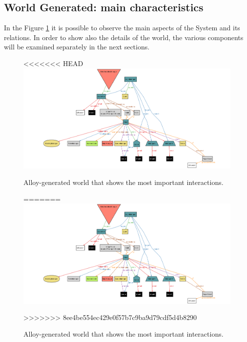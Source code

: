 \documentclass[a4paper, 12pt, oneside]{article}
\begin{document}
\begin{enumerate}[labelindent=20pt, label={UC.\arabic*}, itemindent=1em,leftmargin=!]
\subsection{World Generated: main characteristics}
In the Figure \ref{alloy_world} it is possible to observe the main aspects of the System and its relations. In order to show also the details of the world, the various components will be examined separately in the next sections.
\begin{figure}[h!]
\centering
<<<<<<< HEAD
    \centering
    \includegraphics[height=0.32\textheight, scale=0.3, keepaspectratio]{img/alloy/alloy_world.png}
    \caption{Alloy-generated world that shows the most important interactions.}
    \label{alloy_world}
=======
	\centering
  	\includegraphics[height=0.32\textheight, scale=0.3, keepaspectratio]{img/alloy/alloy_world.png}
	\caption{Alloy-generated world that shows the most important interactions.}
 	\label{alloy_world}
>>>>>>> 8ee4be554ec429e0f57b7c9ba9d79cdf5d4b8290
\end{figure}


\end{enumerate}
\end{document}
